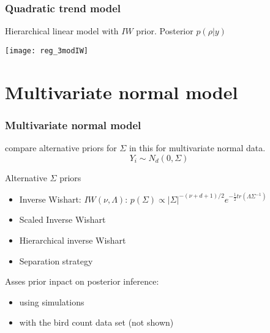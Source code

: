 \documentclass[9pt]{beamer}\usepackage[]{graphicx}\usepackage[]{color}
\begin{document}
\begin{frame}
\frametitle{Quadratic trend model}

Hierarchical linear model with $IW$ prior. Posterior $p(\rho | y)$

\begin{center}
\texttt{[image: reg\_3modIW]}
\end{center}

\end{frame}


\section{Multivariate normal model } 
\begin{frame}
\frametitle{Multivariate normal model }

\cite{Alvarez2014} compare alternative priors for $\Sigma$ in this for multivariate normal data.
\[ Y_i \sim N_d(0, \Sigma) \]

Alternative $\Sigma$ priors
\begin{itemize}
\item Inverse Wishart: $IW(\nu, \Lambda)$:  $p(\Sigma) \propto  |\Sigma|^{-(\nu+ d +1)/2 } e^{-\frac{1}{2} tr( \Lambda \Sigma^{-1}) }$

\item Scaled Inverse Wishart 
\item Hierarchical inverse Wishart
\item Separation strategy 
\end{itemize}

Asses prior inpact on posterior inference:
\begin{itemize}
\item using simulations
\item with the bird count data set (not shown)
\end{itemize}
\end{frame}






% 
% 
\end{document}
